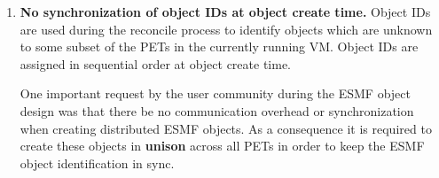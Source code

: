 %


\begin{enumerate}
\item{\bf No synchronization of object IDs at object create time.}
Object IDs are used during the reconcile process to identify objects
which are unknown to some subset of the PETs in the currently running VM.
Object IDs are assigned in sequential order at object create time.

One important request by the user community during the ESMF object design was
that there be no communication overhead or synchronization when creating
distributed ESMF objects. As a consequence it is required to create these
objects in {\bf unison} across all PETs in order to keep the ESMF object
identification in sync.

\end{enumerate}




